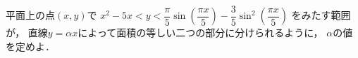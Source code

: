 \documentclass[../../main.tex]{subfiles}
\begin{document}
平面上の点$(x,y)$で
$\displaystyle x^2-5x<y<\dfrac{\pi}{5}\sin\left(\dfrac{\pi x}{5}\right)-\dfrac{3}{5}\sin^2\left(\dfrac{\pi x}{5}\right)$
をみたす範囲が，
直線$y=\alpha x$によって面積の等しい二つの部分に分けられるように，
$\alpha$の値を定めよ．
\end{document}

